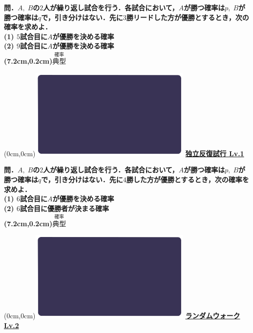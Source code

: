 \documentclass[10pt,
fleqn,
dvipdfmx,
uplatex
]{jsarticle}
\begin{document}
\normalsize 
\bf\boldmath 問．$A,\;B$の$2$人が繰り返し試合を行う．各試合において，$A$が勝つ確率は$p,\;B$が勝つ確率は$q$で，引き分けはない．先に$3$勝リードした方が優勝とするとき，次の確率を求めよ．\\
(1)  $5$試合目に$A$が優勝を決める確率\\
(2)  $9$試合目に$A$が優勝を決める確率\\

\at(7.2cm,0.2cm){\small\color{bradorange}$\overset{\text{確率}}{\text{典型}}$}


\newpage



\at(0cm,0cm){\includegraphics[width=8cm,bb=0 0 1920 1080]{./youtube/thumbnails/templates/smart_background/確率.jpeg}}
{\color{orange}\bf\boldmath\huge\underline{独立反復試行 Lv.1 }}\vspace{0.3zw}

\normalsize 
\bf\boldmath 問．$A,\;B$の$2$人が繰り返し試合を行う．各試合において，$A$が勝つ確率は$p,\;B$が勝つ確率は$q$で，引き分けはない．先に$4$勝した方が優勝とするとき，次の確率を求めよ．\\
(1)  $6$試合目に$A$が優勝を決める確率\\
(2)  $6$試合目に優勝者が決まる確率\\

\at(7.2cm,0.2cm){\small\color{bradorange}$\overset{\text{確率}}{\text{典型}}$}


\newpage



\at(0cm,0cm){\includegraphics[width=8cm,bb=0 0 1920 1080]{./youtube/thumbnails/templates/smart_background/確率.jpeg}}
{\color{orange}\bf\boldmath\LARGE\underline{ランダムウォーク Lv.2 }}\vspace{0.3zw}
\end{document}
